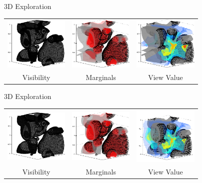 \addtocounter{framenumber}{-1}
\begin{tframe}{3D Exploration}
\begin{center}

\bigskip
\begin{tabular}{ccc}
\includegraphics[width=1.2in]{media_exploration/view_04}&
\includegraphics[width=1.2in]{media_exploration/marginal_04}&
\includegraphics[width=1.2in]{media_exploration/energy_04}
\\ Visibility & Marginals & View Value
\end{tabular}
\end{center}
\end{tframe}

\addtocounter{framenumber}{-1}
\begin{tframe}{3D Exploration}
\begin{center}

\bigskip
\begin{tabular}{ccc}
\includegraphics[width=1.2in]{media_exploration/view_05}&
\includegraphics[width=1.2in]{media_exploration/marginal_05}&
\includegraphics[width=1.2in]{media_exploration/energy_05}
\\ Visibility & Marginals & View Value
\end{tabular}
\end{center}
\end{tframe}

